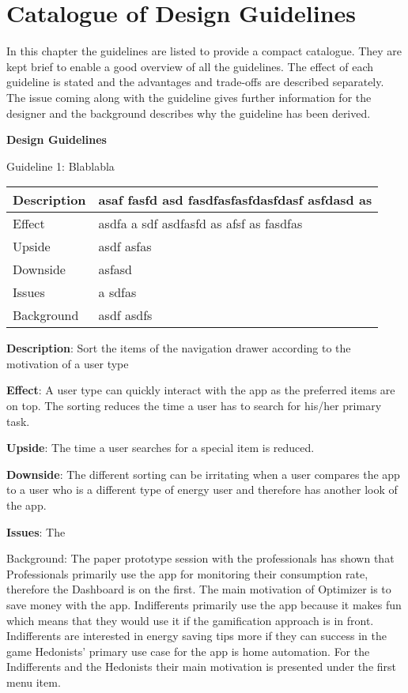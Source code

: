 \chapter{Catalogue of Design Guidelines}

In this chapter the guidelines are listed to provide a compact catalogue. They are kept brief to enable a good overview of all the guidelines. The effect of each guideline is stated and the advantages and trade-offs are described separately. The issue coming along with the guideline gives further information for the designer and the background describes why the guideline has been derived.

\textbf{Design Guidelines}

Guideline 1: Blablabla

\begin{tabular}{|ll|}

	\hline 
	Description & asaf fasfd asd fasdfasfasfdasfdasf asfdasd as \\ 
	\hline 
	Effect &  asdfa a sdf asdfasfd as afsf as fasdfas\\ 
	\hline 
	Upside &   asdf asfas\\ 
	\hline 
	Downside &  asfasd  \\ 
	\hline 
	Issues &  a sdfas \\ 
	\hline 
	Background & asdf asdfs \\ 
	\hline 
\end{tabular} 

\textbf{Description}: Sort the items of the navigation drawer according to the motivation of a user type

\textbf{Effect}: A user type can quickly interact with the app as the preferred items are on top. The sorting reduces the time a user has to search for his/her primary task.

\textbf{Upside}: The time a user searches for a special item is reduced.

\textbf{Downside}: The different sorting can be irritating when a user compares the app to a user who is a different type of energy user and therefore has another look of the app.

\textbf{Issues}: The

Background: The paper prototype session with the professionals has shown that Professionals primarily use the app for monitoring their consumption rate, therefore the Dashboard is on the first. The main motivation of Optimizer is to save money with the app. Indifferents primarily use the app because it makes fun which means that they would use it if the gamification approach is in front. Indifferents are interested in energy saving tips more if they can success in the game
Hedonists' primary use case for the app is home automation. For the Indifferents and the Hedonists their main motivation is presented under the first menu item.